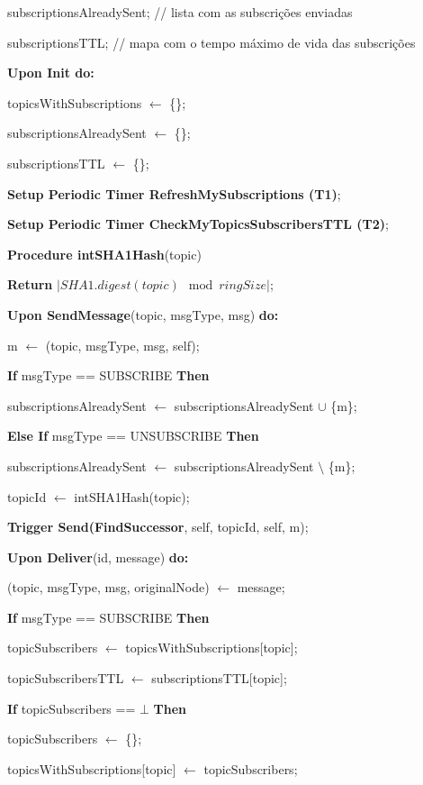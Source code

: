 \documentclass[12pt]{article}
\begin{document}
\qquad subscriptionsAlreadySent; // lista com as subscrições enviadas

\qquad subscriptionsTTL; // mapa com o tempo máximo de vida das subscrições

\bigbreak
\textbf{Upon Init do:}

\qquad topicsWithSubscriptions $\leftarrow$ \{\};

\qquad subscriptionsAlreadySent $\leftarrow$ \{\};

\qquad subscriptionsTTL $\leftarrow$ \{\};

\qquad \textbf{Setup Periodic Timer RefreshMySubscriptions (T1)};

\qquad \textbf{Setup Periodic Timer CheckMyTopicsSubscribersTTL (T2)};

\bigbreak
\textbf{Procedure intSHA1Hash}(topic)

\qquad \textbf{Return} $\lvert SHA1.digest(topic) \mod{ringSize}\rvert$;

\bigbreak
\textbf{Upon SendMessage}(topic, msgType, msg) \textbf{do:}

\qquad m $\leftarrow$ (topic, msgType, msg, self);

\qquad \textbf{If} msgType == SUBSCRIBE \textbf{Then}

\qquad \qquad subscriptionsAlreadySent $\leftarrow$ subscriptionsAlreadySent $\cup$  \{m\};

\qquad \textbf{Else If} msgType == UNSUBSCRIBE \textbf{Then}

\qquad \qquad subscriptionsAlreadySent $\leftarrow$ subscriptionsAlreadySent $\setminus$ \{m\};

\qquad topicId $\leftarrow$ intSHA1Hash(topic);

\qquad \textbf{Trigger Send(FindSuccessor}, self, topicId, self, m);

\bigbreak
\textbf{Upon Deliver}(id, message) \textbf{do:}

\qquad (topic, msgType, msg, originalNode) $\leftarrow$ message;

\qquad \textbf{If} msgType == SUBSCRIBE \textbf{Then}

\qquad \qquad topicSubscribers $\leftarrow$ topicsWithSubscriptions[topic];

\qquad \qquad topicSubscribersTTL $\leftarrow$ subscriptionsTTL[topic];

\qquad \qquad \textbf{If} topicSubscribers == $\bot$ \textbf{Then}

\qquad \qquad \qquad topicSubscribers $\leftarrow$ \{\};

\qquad \qquad \qquad topicsWithSubscriptions[topic] $\leftarrow$ topicSubscribers;
\end{document}
